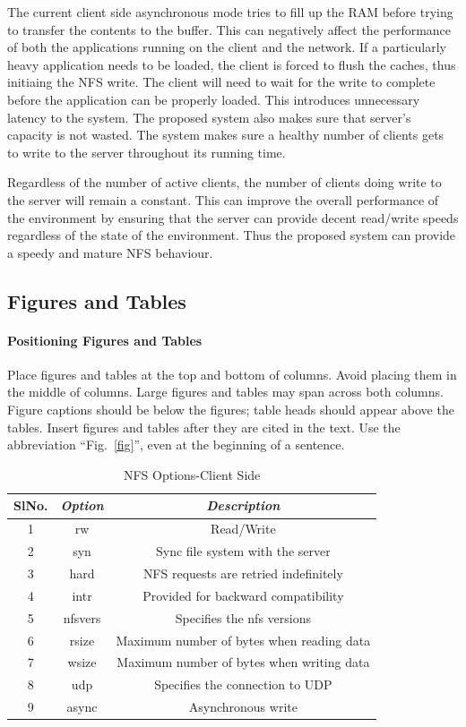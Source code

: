 \documentclass[conference]{IEEEtran}
\begin{document}
The current client side asynchronous mode tries to fill up the RAM before
trying to transfer the contents to the buffer. This can negatively affect
the performance of both the applications running on the client and the
network. If a particularly heavy application needs to be loaded, the client 
is forced to flush the caches, thus initiaing the NFS write. The client
will need to wait for the write to complete before the application can be
properly loaded. This introduces unnecessary latency to the system. The 
proposed system also makes sure that server's capacity is not wasted. The 
system makes sure a healthy number of clients gets to write to the server
throughout its running time.

Regardless of the number of active clients, the number of clients doing
write to the server will remain a constant. This can improve the overall 
performance of the environment by ensuring that the server can provide 
decent read/write speeds regardless of the state of the environment. Thus
the proposed system can provide a speedy and mature NFS behaviour.


\subsection{Figures and Tables}
\paragraph{Positioning Figures and Tables} Place figures and tables at the top and 
bottom of columns. Avoid placing them in the middle of columns. Large 
figures and tables may span across both columns. Figure captions should be 
below the figures; table heads should appear above the tables. Insert 
figures and tables after they are cited in the text. Use the abbreviation 
``Fig.~\ref{fig}'', even at the beginning of a sentence.

\begin{table}[htbp]
\caption{NFS Options-Client Side}
\begin{center}
\begin{tabular}{|c|c|c|}
\hline
\cline{2-3} 
\textbf{SlNo.} & \textbf{\textit{Option}}& \textbf{\textit{Description}} \\
\hline
1& rw & Read/Write  \\
2& syn & Sync file system with the server  \\
3& hard & NFS requests are retried indefinitely  \\
4& intr & Provided for backward compatibility \\
5& nfsvers & Specifies the nfs versions  \\
6& rsize & Maximum number of bytes when reading data  \\
7& wsize & Maximum number of bytes when writing data  \\
8& udp & Specifies the connection to UDP  \\
9& async & Asynchronous write  \\
\hline

\end{tabular}
\label{tab1}
\end{center}
\end{table}
\end{document}
